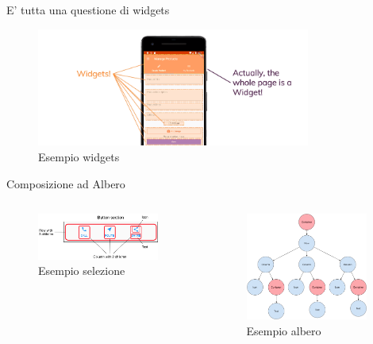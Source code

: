\documentclass{../libs/presentation_format}
\begin{document}

\begin{frame}{E' tutta una questione di widgets}
	\begin{figure}[htpb]
		\centering
		\includegraphics[width=9cm]{../libs/sample-widgets}
		\caption{Esempio widgets}
		\label{fig: Esempio widgets}
	\end{figure}
\end{frame}


\begin{frame}{Composizione ad Albero}
	\begin{minipage}[0.2\textheight]{\textwidth}
		\begin{columns}[T]
			\begin{column}{0.5\textwidth}
				\begin{figure}[htpb]
					\centering
					\includegraphics[width=4cm]{../libs/button-section-diagram}
					\caption{Esempio selezione \cite{flutterLayout}}
					\label{fig:Esempio selezione}
				\end{figure}
			\end{column}
			\begin{column}{0.5\textwidth}
				\begin{figure}[htpb]
					\centering
					\includegraphics[width=4cm]{../libs/sample-flutter-layout}
					\caption{Esempio albero \cite{flutterLayout}}
					\label{fig:Esempio albero}
				\end{figure}
			\end{column}
		\end{columns}
	\end{minipage}
\end{frame}
\end{document}
